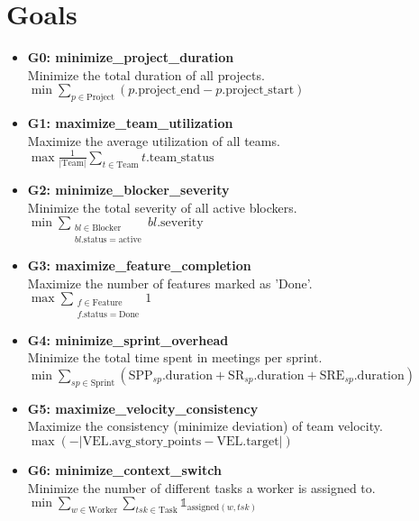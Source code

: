 \documentclass[11pt]{article}
\begin{document}
\section{Goals}
\begin{itemize}
    \item \textbf{G0: minimize\_project\_duration} \\
    Minimize the total duration of all projects. \\
    $\min \sum_{p \in \text{Project}} (p.\text{project\_end} - p.\text{project\_start})$

    \item \textbf{G1: maximize\_team\_utilization} \\
    Maximize the average utilization of all teams. \\
    $\max \frac{1}{|\text{Team}|} \sum_{t \in \text{Team}} t.\text{team\_status}$

    \item \textbf{G2: minimize\_blocker\_severity} \\
    Minimize the total severity of all active blockers. \\
    $\min \sum_{\substack{bl \in \text{Blocker} \\ bl.\text{status} = \text{active}}} bl.\text{severity}$

    \item \textbf{G3: maximize\_feature\_completion} \\
    Maximize the number of features marked as 'Done'. \\
    $\max \sum_{\substack{f \in \text{Feature} \\ f.\text{status} = \text{Done}}} 1$

    \item \textbf{G4: minimize\_sprint\_overhead} \\
    Minimize the total time spent in meetings per sprint. \\
    $\min \sum_{sp \in \text{Sprint}} (\text{SPP}_{sp}.\text{duration} + \text{SR}_{sp}.\text{duration} + \text{SRE}_{sp}.\text{duration})$

    \item \textbf{G5: maximize\_velocity\_consistency} \\
    Maximize the consistency (minimize deviation) of team velocity. \\
    $\max \left( -\left| \text{VEL}.\text{avg\_story\_points} - \text{VEL}.\text{target} \right| \right)$

    \item \textbf{G6: minimize\_context\_switch} \\
    Minimize the number of different tasks a worker is assigned to. \\
    $\min \sum_{w \in \text{Worker}} \sum_{tsk \in \text{Task}} \mathbb{1}_{\text{assigned}(w, tsk)}$


\end{itemize}
\end{document}
